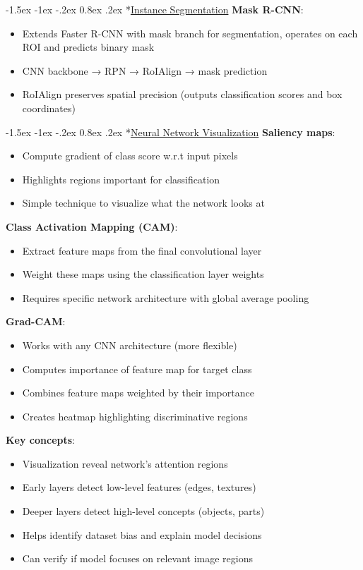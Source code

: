 \documentclass{article}
\makeatletter
\renewcommand\section{\@startsection{section}{1}{\z@}%
                                  {-1.5ex \@plus -1ex \@minus -.2ex}%
                                  {0.8ex \@plus.2ex}%
                                  {\normalfont\small\bfseries}}
\makeatother
\begin{document}
\begin{multicols}{3}
\section*{\underline{Instance Segmentation}}
\textbf{Mask R-CNN}:
\begin{itemize}
\item Extends Faster R-CNN with mask branch for segmentation, operates on each ROI and predicts binary mask
\item CNN backbone → RPN → RoIAlign → mask prediction
\item RoIAlign preserves spatial precision (outputs classification scores and box coordinates)
\end{itemize}

\section*{\underline{Neural Network Visualization}}
\textbf{Saliency maps}:
\begin{itemize}
\item Compute gradient of class score w.r.t input pixels
\item Highlights regions important for classification
\item Simple technique to visualize what the network looks at
\end{itemize}

\textbf{Class Activation Mapping (CAM)}:
\begin{itemize}
\item Extract feature maps from the final convolutional layer
\item Weight these maps using the classification layer weights
\item Requires specific network architecture with global average pooling
\end{itemize}

\textbf{Grad-CAM}:
\begin{itemize}
\item Works with any CNN architecture (more flexible)
\item Computes importance of feature map for target class
\item Combines feature maps weighted by their importance
\item Creates heatmap highlighting discriminative regions
\end{itemize}

\textbf{Key concepts}:
\begin{itemize}
\item Visualization reveal network's attention regions
\item Early layers detect low-level features (edges, textures)
\item Deeper layers detect high-level concepts (objects, parts)
\item Helps identify dataset bias and explain model decisions
\item Can verify if model focuses on relevant image regions
\end{itemize}


\end{multicols}
\end{document}
